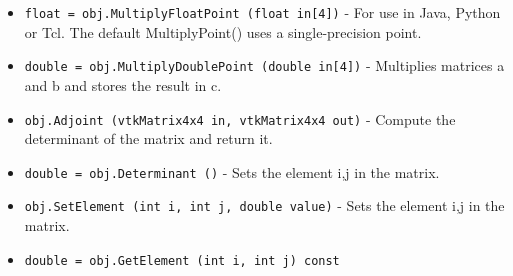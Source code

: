 \begin{itemize}
\item  \verb|float = obj.MultiplyFloatPoint (float in[4])| -  For use in Java, Python or Tcl.  The default MultiplyPoint() uses
 a single-precision point.

\item  \verb|double = obj.MultiplyDoublePoint (double in[4])| -  Multiplies matrices a and b and stores the result in c.

\item  \verb|obj.Adjoint (vtkMatrix4x4 in, vtkMatrix4x4 out)| -  Compute the determinant of the matrix and return it.

\item  \verb|double = obj.Determinant ()| -  Sets the element i,j in the matrix.

\item  \verb|obj.SetElement (int i, int j, double value)| -  Sets the element i,j in the matrix.

\item  \verb|double = obj.GetElement (int i, int j) const|

\end{itemize}
